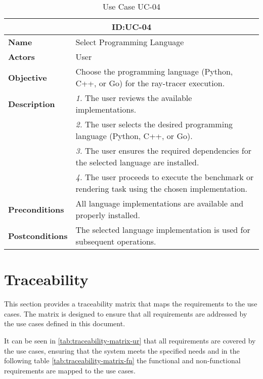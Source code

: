 \begin{table}[H]
    \centering
    \begin{tabular}{l p{10cm}}
        \toprule
        \multicolumn{2}{c}{\textbf{ID:\@ UC-04}} \\
        \toprule
        \textbf{Name}               &  Select Programming Language \\
        \textbf{Actors}             &  User \\
        \textbf{Objective}          &  Choose the programming language (Python, C++, or Go) for the ray-tracer execution. \\
        \textbf{Description}        & \textsl{1.} The user reviews the available implementations. \\
                                   & \textsl{2.} The user selects the desired programming language (Python, C++, or Go). \\
                                   & \textsl{3.} The user ensures the required dependencies for the selected language are installed. \\
                                   & \textsl{4.} The user proceeds to execute the benchmark or rendering task using the chosen implementation. \\
        \textbf{Preconditions}      &  All language implementations are available and properly installed. \\
        \textbf{Postconditions}     &  The selected language implementation is used for subsequent operations. \\
    \end{tabular}
    \caption{Use Case UC-04}\label{tab:uc-04}
\end{table}



\section{Traceability}

This section provides a traceability matrix that maps the requirements to the use cases. The matrix is designed to ensure that all requirements are addressed by the use cases defined in this document.

It can be seen in \autoref{tab:traceability-matrix-ur} that all requirements are covered by the use cases, ensuring that the system meets the specified needs and in the following table \autoref{tab:traceability-matrix-fn} the functional and non-functional requirements are mapped to the use cases.

